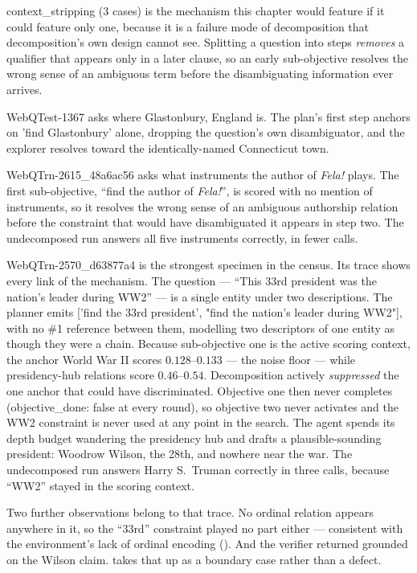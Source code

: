 \textsf{context\_stripping} ($3$ cases) is the mechanism this chapter would
feature if it could feature only one, because it is a failure mode of
decomposition that decomposition's own design cannot see. Splitting a question
into steps \emph{removes} a qualifier that appears only in a later clause, so an
early sub-objective resolves the wrong sense of an ambiguous term before the
disambiguating information ever arrives.

\textsf{WebQTest-1367} asks where Glastonbury, England is. The plan's first step
anchors on \textsf{'find Glastonbury'} alone, dropping the question's own
disambiguator, and the explorer resolves toward the identically-named
Connecticut town.

\textsf{WebQTrn-2615\_48a6ac56} asks what instruments the author of \emph{Fela!}
plays. The first sub-objective, ``find the author of \emph{Fela!}'', is scored
with no mention of instruments, so it resolves the wrong sense of an ambiguous
authorship relation before the constraint that would have disambiguated it
appears in step two. The undecomposed run answers all five instruments
correctly, in fewer calls.

\textsf{WebQTrn-2570\_d63877a4} is the strongest specimen in the census. Its
trace shows every link of the mechanism. The question --- ``This 33rd president
was the nation's leader during WW2'' --- is a single entity under two
descriptions. The planner emits \textsf{['find the 33rd president', "find the
nation's leader during WW2"]}, with no \textsf{\#1} reference between them,
modelling two descriptors of one entity as though they were a chain. Because
sub-objective one is the active scoring context, the anchor \textsf{World War
II} scores $0.128$--$0.133$ --- the noise floor --- while presidency-hub
relations score $0.46$--$0.54$. Decomposition actively \emph{suppressed} the one
anchor that could have discriminated. Objective one then never completes
(\textsf{objective\_done: false} at every round), so objective two never
activates and the WW2 constraint is never used at any point in the search. The
agent spends its depth budget wandering the presidency hub and drafts a
plausible-sounding president: Woodrow Wilson, the 28th, and nowhere near the
war. The undecomposed run answers Harry S.~Truman correctly in three calls,
because ``WW2'' stayed in the scoring context.

Two further observations belong to that trace. No ordinal relation appears
anywhere in it, so the ``33rd'' constraint played no part either --- consistent
with the environment's lack of ordinal encoding (). And the
verifier returned \textsf{grounded} on the Wilson claim.
 takes that up as a boundary case rather than a
defect.

